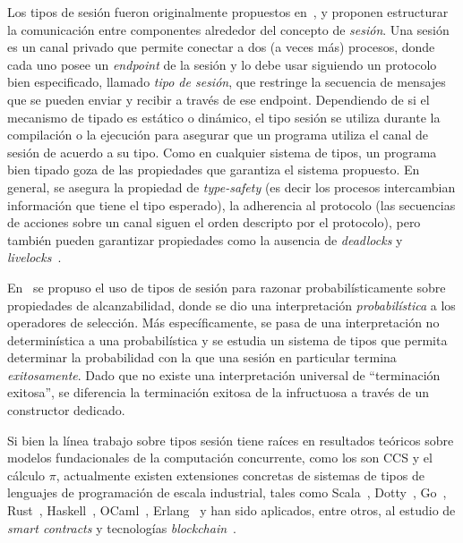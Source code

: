 Los tipos de sesión fueron originalmente propuestos en~\cite {Honda93}, y
proponen estructurar la comunicación entre componentes alrededor
del concepto de {\em sesión}. Una {sesión} es un canal privado que permite
conectar a dos (a veces más) procesos, donde cada uno posee un
\emph{endpoint} de la sesión y lo debe usar siguiendo un protocolo bien
especificado, llamado \emph{tipo de sesión}, que restringe la secuencia de
mensajes que se pueden enviar y recibir a través de ese endpoint. Dependiendo
de si el mecanismo de tipado es estático o dinámico, el tipo sesión se utiliza
durante la compilación o la ejecución para asegurar que un programa utiliza el
canal de sesión de acuerdo a su tipo. Como en cualquier sistema de tipos, un
programa bien tipado goza de las propiedades que garantiza el sistema
propuesto. En general, se asegura la propiedad de  {\em type-safety} (es decir
los procesos intercambian información que tiene el tipo esperado), la
adherencia al protocolo (las secuencias de acciones sobre un canal siguen el
orden descripto por el protocolo), pero también pueden garantizar propiedades
como la ausencia de {\em deadlocks} y {\em livelocks}~\cite{HuttelEtAl16}.

En~\cite{DBLP:conf/concur/InversoMPTT20} se propuso el uso de tipos de sesión
para razonar probabilísticamente sobre propiedades de alcanzabilidad, donde
se dio una interpretación \emph{probabilística} a los operadores de
selección. Más específicamente, se pasa de una interpretación no
determinística a una probabilística y se estudia un sistema de tipos que
permita determinar la probabilidad con la que una sesión en particular
termina \emph{exitosamente}. Dado que no existe una interpretación universal
de ``terminación exitosa'', se diferencia la terminación exitosa de la
infructuosa a través de un {constructor dedicado}.

Si bien la línea trabajo sobre tipos sesión tiene raíces en resultados
teóricos sobre modelos fundacionales de la computación concurrente, como
los son CCS y el cálculo $\pi$, actualmente existen extensiones
concretas de sistemas de tipos de lenguajes de programación de escala
industrial, tales como Scala~\cite{DBLP:conf/pldi/ScalasYB19},
Dotty~\cite{DBLP:conf/pldi/ScalasYB19},
Go~\cite{DBLP:conf/icse/LangeNTY18,DBLP:conf/icse/LangeNTY18},
Rust~\cite{DBLP:journals/corr/abs-1909-05970,DBLP:conf/coordination/LagaillardieNY20},
Haskell~\cite{orchard2017session,DBLP:conf/haskell/LindleyM16},
OCaml~\cite{DBLP:journals/jfp/Padovani17,DBLP:conf/coordination/LagaillardieNY20,DBLP:conf/ecoop/ImaiNYY19},
Erlang~\cite{fowler2016erlang} y han sido aplicados, entre otros, al estudio de
{\em smart contracts} y tecnologías {\em
blockchain}~\cite{10.1145/3417516,DBLP:journals/corr/abs-1902-06056}. 

